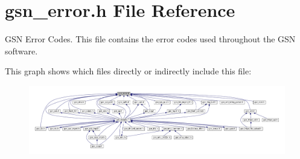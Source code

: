 \hypertarget{a00493}{
\section{gsn\_\-error.h File Reference}
\label{a00493}
}


GSN Error Codes. This file contains the error codes used throughout the GSN software.  


This graph shows which files directly or indirectly include this file:
\nopagebreak
\begin{figure}[H]
\begin{center}
\leavevmode
\includegraphics[width=400pt]{a00724}
\end{center}
\end{figure}
